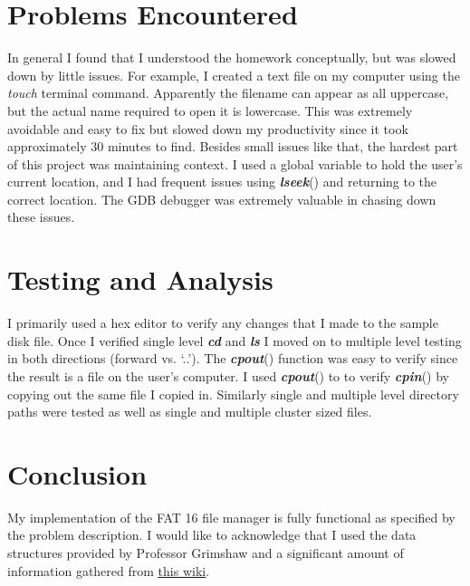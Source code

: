 \documentclass[12pt,letter,titlepage]{article}
\begin{document}
\section*{Problems Encountered}
In general I found that I understood the homework conceptually, but was slowed down by little issues. For example, I created a text file on my computer using the \textit{touch} terminal command. Apparently the filename can appear as all uppercase, but the actual name required to open it is lowercase. This was extremely avoidable and easy to fix but slowed down my productivity since it took approximately 30 minutes to find. Besides small issues like that, the hardest part of this project was maintaining context. I used a global variable to hold the user's current location, and I had frequent issues using {\color{cyan}\textbf{\textit{lseek}}}() and returning to the correct location. The GDB debugger was extremely valuable in chasing down these issues. 


\section*{Testing and Analysis}
I primarily used a hex editor to verify any changes that I made to the sample disk file. Once I verified single level {\color{orange}\textbf{\textit{cd}}} and {\color{orange}\textbf{\textit{ls}}} I moved on to multiple level testing in both directions (forward vs. `..'). The {\color{orange}\textbf{\textit{cpout}}}() function was easy to verify since the result is a file on the user's computer. I used {\color{orange}\textbf{\textit{cpout}}}() to to verify {\color{orange}\textbf{\textit{cpin}}}() by copying out the same file I copied in. Similarly single and multiple level directory paths were tested as well as single and multiple cluster sized files.

\section*{Conclusion}
My implementation of the FAT 16 file manager is fully functional as specified by the problem description. I would like to acknowledge that I used the data structures provided by Professor Grimshaw and a significant amount of information gathered from \href{http://wiki.osdev.org/FAT#FAT_16}{\color{blue}\underline{this wiki}}.
\end{document}
